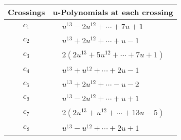 \documentclass[1p]{elsarticle_modified}
\theoremstyle{definition}
\begin{document}
\begin{tabular}{m{50pt}|m{274pt}}
Crossings & \hspace{64pt}u-Polynomials at each crossing \\
\hline $$\begin{aligned}c_{1}\end{aligned}$$&$\begin{aligned}
&u^{13}-2 u^{12}+\cdots+7 u+1
\end{aligned}$\\
\hline $$\begin{aligned}c_{2}\end{aligned}$$&$\begin{aligned}
&u^{13}+2 u^{12}+\cdots+u-1
\end{aligned}$\\
\hline $$\begin{aligned}c_{3}\end{aligned}$$&$\begin{aligned}
&2(2 u^{13}+5 u^{12}+\cdots+7 u+1)
\end{aligned}$\\
\hline $$\begin{aligned}c_{4}\end{aligned}$$&$\begin{aligned}
&u^{13}+u^{12}+\cdots+2 u-1
\end{aligned}$\\
\hline $$\begin{aligned}c_{5}\end{aligned}$$&$\begin{aligned}
&u^{13}+2 u^{12}+\cdots- u-2
\end{aligned}$\\
\hline $$\begin{aligned}c_{6}\end{aligned}$$&$\begin{aligned}
&u^{13}-2 u^{12}+\cdots+u+1
\end{aligned}$\\
\hline $$\begin{aligned}c_{7}\end{aligned}$$&$\begin{aligned}
&2(2 u^{13}+u^{12}+\cdots+13 u-5)
\end{aligned}$\\
\hline $$\begin{aligned}c_{8}\end{aligned}$$&$\begin{aligned}
&u^{13}- u^{12}+\cdots+2 u+1
\end{aligned}$\\

\end{tabular}
\end{document}
